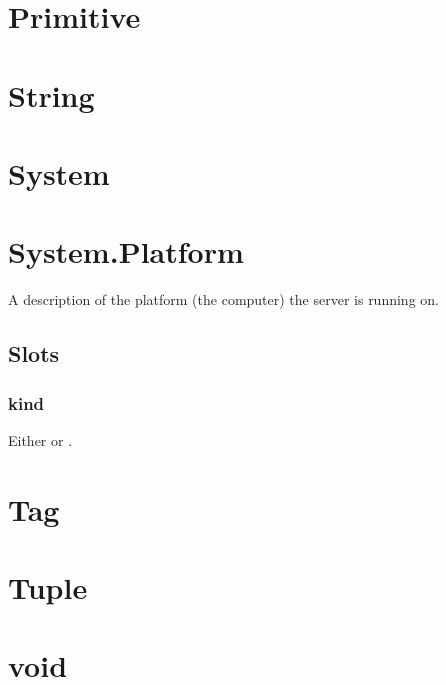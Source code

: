 \section{Primitive}
\section{String}

\section{System}

\section{System.Platform}

A description of the platform (the computer) the server is running on.
\subsection{Slots}

\subsubsection{kind}
Either  or .

\section{Tag}
\section{Tuple}
\section{void}


\let\section\sectionOrig
